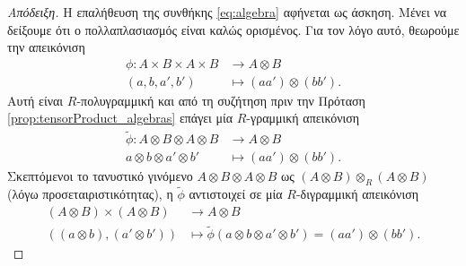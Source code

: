 \documentclass[12pt,a4paper,reqno]{amsart}
\theoremstyle{definition}
\theoremstyle{remark}
\numberwithin{theorem}{section}
\numberwithin{exercise}{section}
\numberwithin{equation}{section}
\renewcommand{\to}{\rightarrow}
\begin{document}
\begin{proof}[Απόδειξη]
    Η επαλήθευση της συνθήκης \eqref{eq:algebra} αφήνεται ως άσκηση. Μένει να δείξουμε ότι ο πολλαπλασιασμός είναι καλώς ορισμένος. Για τον λόγο αυτό, θεωρούμε την απεικόνιση 
    \begin{align*}
        \phi : A \times B \times A \times B &\to A \otimes B \\
        (a,b,a',b') &\mapsto (aa') \otimes (bb').
    \end{align*}
    Αυτή είναι $R$-πολυγραμμική και από τη συζήτηση πριν την Πρόταση \ref{prop:tensorProduct_algebras} επάγει μία $R$-γραμμική απεικόνιση 
    \begin{align*}
       \tilde{\phi} : A \otimes B \otimes A \otimes B &\to A \otimes B \\ 
        a\otimes b \otimes a' \otimes b' &\mapsto (aa') \otimes (bb').
    \end{align*}
    Σκεπτόμενοι το τανυστικό γινόμενο $A \otimes B \otimes A \otimes B$ ως $(A \otimes B) \otimes_R (A \otimes B)$ (λόγω προσεταιριστικότητας), η $\tilde{\phi}$ αντιστοιχεί σε μία $R$-διγραμμική απεικόνιση 
    \begin{align*}
        (A \otimes B) \times (A \otimes B) &\to A \otimes B \\
        \left(
            (a \otimes b), (a' \otimes b')
        \right) &\mapsto \tilde{\phi}(a\otimes b \otimes a' \otimes b') = (aa') \otimes (bb').
    \end{align*}
\end{proof}
\end{document}
